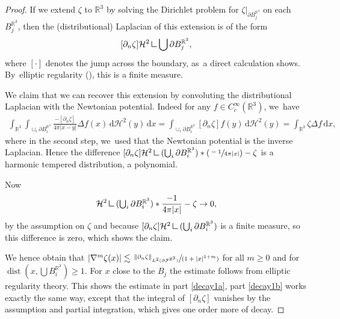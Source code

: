 \documentclass[JEP,XML,SOM,Unicode,published]{cedram}
\let\ts\textstyle
\newcommand{\Psfrac}[2]{(\sfrac{#1}{#2})}
\newcommand{\spfrac}[2]{\sfrac{#1}{(#2)}}
\theoremstyle{definition}
\DeclareMathOperator{\dist}{dist}
\newcommand\R{\mathbb{R}}
\newcommand\norm[1]{\left\lVert #1\right\rVert}
\newcommand\eq{=}
\newcommand\dd{\,\mathrm{d}}
\newcommand\dx{\dd x}
\newcommand{\mres}{\mathbin{\vrule height 1.6ex depth 0pt width
0.13ex\vrule height 0.13ex depth 0pt width 1.3ex}}
\let\de\partial
\begin{document}
\begin{proof}
If we extend $\zeta$ to $\R^3$ by solving the Dirichlet problem for $\zeta|_{\de B_j^{\R^3}}$ on each~$B_j^{\R^3}$, then the (distributional) Laplacian of this extension is of the form
\[
[\de_n\zeta]\mathcal{H}^2\mres{ \bigcup \de B_j^{\R^3}},
\]
 where $[\cdot]$ denotes the jump across the boundary, as~a direct calculation shows. By~elliptic regularity (\cf \cite[Chap.\,2]{grisvard2011elliptic}), this is a finite measure.

We claim that we can recover this extension by convoluting the distributional Laplacian with the Newtonian potential. Indeed for any $f\in C_c^\infty(\R^3)$, we~have
\begin{align*}
\int_{\R^3}\int_{\cup_i\de B_i^{\R^3}}\frac{-[\de_n\zeta]}{4\pi|x-y|}\Delta f(x)\,\text{d}\mathcal{H}^2(y)\dx\eq\int_{\cup_i\de B_i^{\R^3}}[\de_n\zeta]f(y)\,\text{d}\mathcal{H}^2(y)\eq \int_{\R^3}\zeta \Delta f\dx,
\end{align*}
where in the second step, we~used that the Newtonian potential is the inverse Laplacian. Hence the difference $[\de_n\zeta]\mathcal{H}^2\mres(\bigcup_i\de B_i^{\R^3})*\Psfrac{-1}{4\pi|x|}-\zeta$ is a harmonic tempered distribution, \ie a polynomial.

Now
\begin{align*}
[\de_n\zeta]\mathcal{H}^2\mres({\ts\bigcup_i\de B_i^{\R^3}})*\frac{-1}{4\pi|x|}-\zeta\to 0,
\end{align*}
by the assumption on $\zeta$ and because $[\de_n\zeta]\mathcal{H}^2\mres(\bigcup_i\de B_i^{\R^3})$ is a finite measure, so this difference is zero, which shows the claim.

We hence obtain that $|\nabla^m\zeta(x)|\lesssim\spfrac{\norm{\de_n\zeta}_{L^2(\de\mathcal{F}^{\R^3})}}{1+|x|^{1+m}}$ for all $m\geq0$ and for $\dist(x,\bigcup B_i^{\R^3})\geq 1$. For $x$ close to the $B_j$ the estimate follows from elliptic regularity theory. This shows the estimate in part \eqref{decay1a}, part \eqref{decay1b} works exactly the same way, except that the integral of $[\de_n\zeta]$ vanishes by the assumption and partial integration, which gives one order more of decay.


\end{proof}
\end{document}
